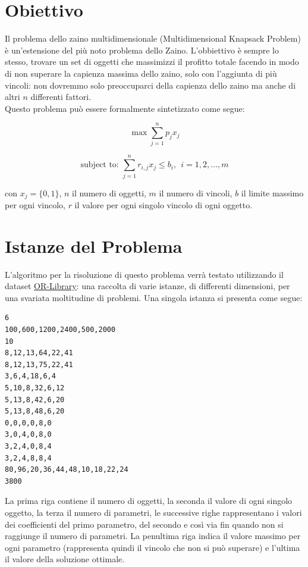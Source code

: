 \section{Obiettivo}
Il problema dello zaino multidimensionale (Multidimensional Knapsack Problem) è
un'estensione del più noto problema dello Zaino. L'obbiettivo è sempre lo
stesso, trovare un set di oggetti che massimizzi il profitto totale facendo in
modo di non superare la capienza massima dello zaino, solo con l'aggiunta di più
vincoli: non dovremmo solo preoccuparci della capienza dello zaino ma anche di
altri $n$ differenti fattori.\\

Questo problema può essere formalmente sintetizzato come segue:

\[
    \max \sum_{j=1}^{n} p_j x_j
\]

\[
    \text{subject to: } \sum_{j=1}^{n} r_{i,j} x_j \leq b_i, \ \ i = 1,2,\ldots, m
\]

con $x_j = \{0, 1\}$, $n$ il numero di oggetti, $m$ il numero di vincoli, $b$ il limite massimo per ogni vincolo,
$r$ il valore per ogni singolo vincolo di ogni oggetto.

\section{Istanze del Problema}

L'algoritmo per la risoluzione di questo problema verrà testato utilizzando il dataset
\href{http://people.brunel.ac.uk/~mastjjb/jeb/orlib/mknapinfo.html}{OR-Library}: una
raccolta di varie istanze, di differenti dimensioni, per una svariata moltitudine di
problemi. Una singola istanza si presenta come segue:

\begin{lstlisting}[caption={Esempio di Istanza di un problema MKP con 6 oggetti e 10 vincoli.}]
6
100,600,1200,2400,500,2000
10
8,12,13,64,22,41
8,12,13,75,22,41
3,6,4,18,6,4
5,10,8,32,6,12
5,13,8,42,6,20
5,13,8,48,6,20
0,0,0,0,8,0
3,0,4,0,8,0
3,2,4,0,8,4
3,2,4,8,8,4
80,96,20,36,44,48,10,18,22,24
3800
\end{lstlisting}

La prima riga contiene il numero di oggetti, la seconda il valore di ogni singolo
oggetto, la terza il numero di parametri, le successive righe rappresentano i
valori dei coefficienti del primo parametro, del secondo e così via fin quando non si raggiunge il
numero di parametri. La penultima riga indica il valore massimo per ogni parametro (rappresenta quindi
il vincolo che non si può superare) e
l'ultima il valore della soluzione ottimale.

